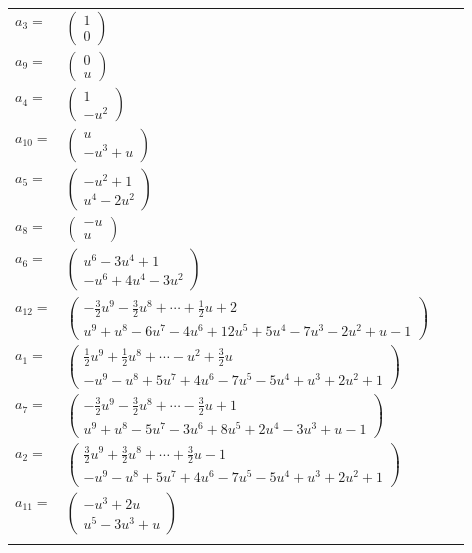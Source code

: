 \documentclass[1p]{elsarticle_modified}
\theoremstyle{definition}
\begin{document}
\begin{tabular}{m{7pt} m{180pt} m{7pt} m{180pt} }
\flushright $a_{3}=$&$\begin{pmatrix}1\\0\end{pmatrix}$ \\
\flushright $a_{9}=$&$\begin{pmatrix}0\\u\end{pmatrix}$ \\
\flushright $a_{4}=$&$\begin{pmatrix}1\\- u^2\end{pmatrix}$ \\
\flushright $a_{10}=$&$\begin{pmatrix}u\\- u^3+u\end{pmatrix}$ \\
\flushright $a_{5}=$&$\begin{pmatrix}- u^2+1\\u^4-2 u^2\end{pmatrix}$ \\
\flushright $a_{8}=$&$\begin{pmatrix}- u\\u\end{pmatrix}$ \\
\flushright $a_{6}=$&$\begin{pmatrix}u^6-3 u^4+1\\- u^6+4 u^4-3 u^2\end{pmatrix}$ \\
\flushright $a_{12}=$&$\begin{pmatrix}-\frac{3}{2} u^9-\frac{3}{2} u^8+\cdots+\frac{1}{2} u+2\\u^9+u^8-6 u^7-4 u^6+12 u^5+5 u^4-7 u^3-2 u^2+u-1\end{pmatrix}$ \\
\flushright $a_{1}=$&$\begin{pmatrix}\frac{1}{2} u^9+\frac{1}{2} u^8+\cdots- u^2+\frac{3}{2} u\\- u^9- u^8+5 u^7+4 u^6-7 u^5-5 u^4+u^3+2 u^2+1\end{pmatrix}$ \\
\flushright $a_{7}=$&$\begin{pmatrix}-\frac{3}{2} u^9-\frac{3}{2} u^8+\cdots-\frac{3}{2} u+1\\u^9+u^8-5 u^7-3 u^6+8 u^5+2 u^4-3 u^3+u-1\end{pmatrix}$ \\
\flushright $a_{2}=$&$\begin{pmatrix}\frac{3}{2} u^9+\frac{3}{2} u^8+\cdots+\frac{3}{2} u-1\\- u^9- u^8+5 u^7+4 u^6-7 u^5-5 u^4+u^3+2 u^2+1\end{pmatrix}$ \\
\flushright $a_{11}=$&$\begin{pmatrix}- u^3+2 u\\u^5-3 u^3+u\end{pmatrix}$\\&\end{tabular}
\end{document}
